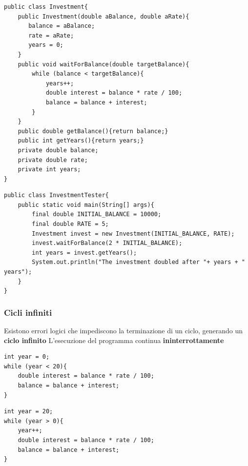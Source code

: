 \begin{frame}[fragile]
\begin{lstlisting}
public class Investment{
    public Investment(double aBalance, double aRate){ 
       balance = aBalance;
       rate = aRate;
       years = 0;
    }
    public void waitForBalance(double targetBalance){ 
        while (balance < targetBalance){ 
            years++;
            double interest = balance * rate / 100;
            balance = balance + interest;
        }
    }
    public double getBalance(){return balance;}
    public int getYears(){return years;}
    private double balance;
    private double rate;
    private int years;
}
\end{lstlisting}
\end{frame}

\begin{frame}[fragile]
\begin{lstlisting}
public class InvestmentTester{
    public static void main(String[] args){
        final double INITIAL_BALANCE = 10000;
        final double RATE = 5;
        Investment invest = new Investment(INITIAL_BALANCE, RATE);
        invest.waitForBalance(2 * INITIAL_BALANCE);
        int years = invest.getYears();
        System.out.println("The investment doubled after "+ years + " years");
    }
}
\end{lstlisting}
\end{frame}

\begin{frame}[fragile]
\frametitle{Cicli infiniti}
\begin{block}{}
Esistono errori logici che impediscono la terminazione di un ciclo, generando un \textbf{\alert{ciclo infinito}}
L'esecuzione del programma continua \textbf{\alert{ininterrottamente}}
\end{block}
\begin{lstlisting}
int year = 0;
while (year < 20){ 
    double interest = balance * rate / 100;
    balance = balance + interest;
}
\end{lstlisting}
\pause
\begin{lstlisting}
int year = 20;
while (year > 0){
    year++;
    double interest = balance * rate / 100;
    balance = balance + interest;
}
\end{lstlisting}
\end{frame}

